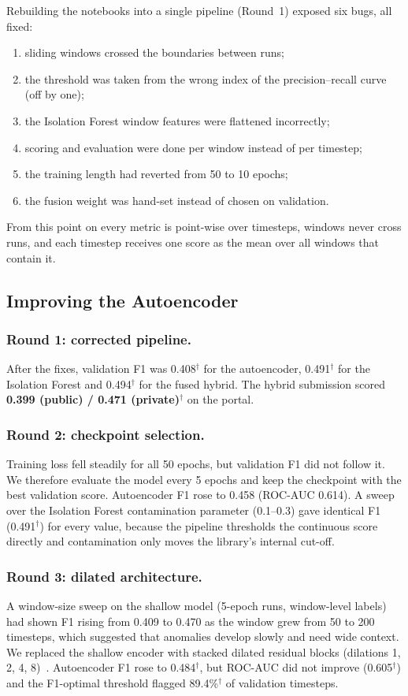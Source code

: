 \documentclass[runningheads]{llncs}
\newcommand{\doc}{$^\dagger$}
\begin{document}
Rebuilding the notebooks into a single pipeline (Round~1) exposed six bugs, all fixed:
\begin{enumerate}
  \item sliding windows crossed the boundaries between runs;
  \item the threshold was taken from the wrong index of the precision--recall curve (off by one);
  \item the Isolation Forest window features were flattened incorrectly;
  \item scoring and evaluation were done per window instead of per timestep;
  \item the training length had reverted from 50 to 10 epochs;
  \item the fusion weight was hand-set instead of chosen on validation.
\end{enumerate}
From this point on every metric is point-wise over timesteps, windows never cross runs, and each timestep receives one score as the mean over all windows that contain it.

\subsection{Improving the Autoencoder}

\subsubsection{Round 1: corrected pipeline.} After the fixes, validation F1 was 0.408\doc{} for the autoencoder, 0.491\doc{} for the Isolation Forest and 0.494\doc{} for the fused hybrid. The hybrid submission scored \textbf{0.399 (public) / 0.471 (private)}\doc{} on the portal.

\subsubsection{Round 2: checkpoint selection.} Training loss fell steadily for all 50 epochs, but validation F1 did not follow it. We therefore evaluate the model every 5 epochs and keep the checkpoint with the best validation score. Autoencoder F1 rose to 0.458 (ROC-AUC 0.614). A sweep over the Isolation Forest contamination parameter (0.1--0.3) gave identical F1 (0.491\doc) for every value, because the pipeline thresholds the continuous score directly and contamination only moves the library's internal cut-off.

\subsubsection{Round 3: dilated architecture.} A window-size sweep on the shallow model (5-epoch runs, window-level labels) had shown F1 rising from 0.409 to 0.470 as the window grew from 50 to 200 timesteps, which suggested that anomalies develop slowly and need wide context. We replaced the shallow encoder with stacked dilated residual blocks (dilations 1, 2, 4, 8)~\cite{bai2018empirical,oord2016wavenet}. Autoencoder F1 rose to 0.484\doc, but ROC-AUC did not improve (0.605\doc) and the F1-optimal threshold flagged 89.4\%\doc{} of validation timesteps.
\end{document}
